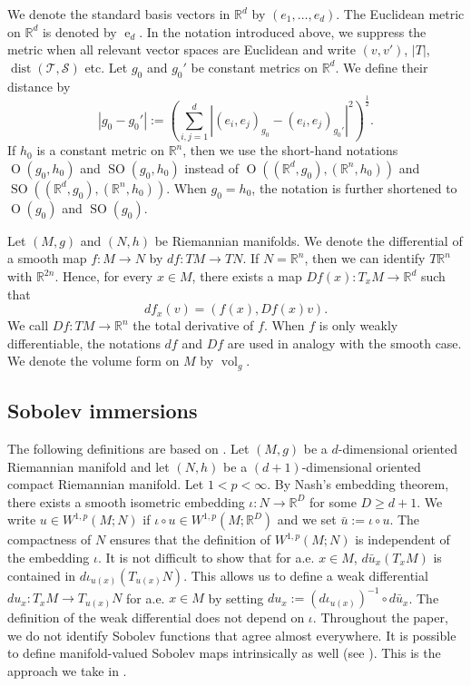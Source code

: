 \documentclass{article}
\numberwithin{equation}{section}
\theoremstyle{definition}
\theoremstyle{remark}
\DeclareMathOperator{\dist}{dist}
\DeclareMathOperator{\e}{e}
\DeclareMathOperator{\Ort}{O}
\DeclareMathOperator{\SO}{SO}
\DeclareMathOperator{\vol}{vol}
\begin{document}
We denote the standard basis vectors in $\mathbb{R}^d$ by $(e_1, \dots, e_d)$. The Euclidean metric on $\mathbb{R}^d$ is denoted by $\e_d$. In the notation introduced above, we suppress the metric when all relevant vector spaces are Euclidean and write $(v, v')$, $|T|$, $\dist(\mathcal{T}, \mathcal{S})$ etc. Let $g_0$ and $g_0'$ be constant metrics on $\mathbb{R}^d$. We define their distance by
\[
|g_0 - g_0'| := \left(\sum_{i, j = 1}^d |(e_i, e_j)_{g_0} - (e_i, e_j)_{g_0'}|^2\right)^\frac{1}{2}.
\]
If $h_0$ is a constant metric on $\mathbb{R}^n$, then we use the short-hand notations $\Ort(g_0, h_0)$ and $\SO(g_0, h_0)$ instead of $\Ort((\mathbb{R}^d, g_0), (\mathbb{R}^n, h_0))$ and $\SO((\mathbb{R}^d, g_0), (\mathbb{R}^n, h_0))$. When $g_0 = h_0$, the notation is further shortened to $\Ort(g_0)$ and $\SO(g_0)$.

Let $(M, g)$ and $(N, h)$ be Riemannian manifolds. We denote the differential of a smooth map $f : M \rightarrow N$ by $df : TM \rightarrow TN$. If $N = \mathbb{R}^n$, then we can identify $T\mathbb{R}^n$ with $\mathbb{R}^{2n}$. Hence, for every $x \in M$, there exists a map $Df(x) : T_xM \rightarrow \mathbb{R}^d$ such that
\[
df_x(v) = (f(x), Df(x)v).
\]
We call $Df : TM \rightarrow \mathbb{R}^n$ the total derivative of $f$. When $f$ is only weakly differentiable, the notations $df$ and $Df$ are used in analogy with the smooth case. We denote the volume form on $M$ by $\vol_g$.

\subsection{Sobolev immersions} \label{sec:sobolev_immersions}

The following definitions are based on \cite[Sections 2.4, 2.5]{AKM}. Let $(M, g)$ be a $d$-dimensional oriented Riemannian manifold and let $(N, h)$ be a $(d + 1)$-dimensional oriented compact Riemannian manifold. Let $1 < p < \infty$. By Nash's embedding theorem, there exists a smooth isometric embedding $\iota : N \rightarrow \mathbb{R}^D$ for some $D \ge d + 1$. We write $u \in W^{1, p}(M; N)$ if $\iota \circ u \in W^{1, p}(M; \mathbb{R}^D)$ and we set $\bar{u} := \iota \circ u$. The compactness of $N$ ensures that the definition of $W^{1, p}(M; N)$ is independent of the embedding $\iota$. It is not difficult to show that for a.e. $x \in M$, $d\bar{u}_x(T_xM)$ is contained in $d\iota_{u(x)}(T_{u(x)}N)$. This allows us to define a weak differential $du_x : T_xM \rightarrow T_{u(x)}N$ for a.e. $x \in M$ by setting $du_x := (d\iota_{u(x)})^{-1} \circ d\bar{u}_x$. The definition of the weak differential does not depend on $\iota$. Throughout the paper, we do not identify Sobolev functions that agree almost everywhere. It is possible to define manifold-valued Sobolev maps intrinsically as well (see \cite{CVS}). This is the approach we take in \cite{B2}.
\end{document}
